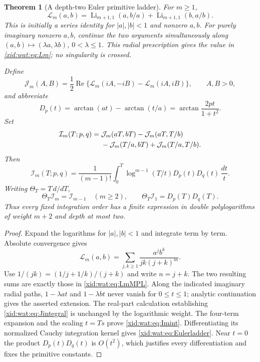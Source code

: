 \documentclass[11pt,a4paper]{article}
\numberwithin{equation}{section}
\newtheorem{theorem}{Theorem}[section]
\theoremstyle{definition}
\theoremstyle{remark}
\begin{document}
\begin{theorem}[A depth-two Euler primitive ladder]
\label{xid:wat:thm:ladder}
For $m\geq1$,
\begin{equation}\label{xid:wat:eq:LmMPL}
 \mathcal L_m(a,b)
 =\operatorname{Li}_{m+1,1}(a,b/a)
  +\operatorname{Li}_{m+1,1}(b,a/b).
\end{equation}
This is initially a series identity for $|a|,|b|<1$ and nonzero $a,b$.
For purely imaginary nonzero $a,b$, continue the two arguments
simultaneously along $(a,b)\mapsto(\lambda a,\lambda b)$,
$0<\lambda\leq1$. This radial prescription gives the value in
\eqref{xid:wat:eq:Lm}; no singularity is crossed.

Define
\[
 \mathcal J_m(A,B)=\frac12\operatorname{Re}
     \{\mathcal L_m(iA,-iB)-\mathcal L_m(iA,iB)\},
 \qquad A,B>0,
\]
and abbreviate
\[
 D_p(t)=\arctan(at)-\arctan(t/a)
       =\arctan\frac{2pt}{1+t^2}.
\]
Set
\begin{align}\label{xid:wat:eq:Imclosed}
 \mathcal I_m(T;p,q)
 ={}&\mathcal J_m(aT,bT)-\mathcal J_m(aT,T/b)\notag\\
   &-\mathcal J_m(T/a,bT)+\mathcal J_m(T/a,T/b).
\end{align}
Then
\begin{equation}\label{xid:wat:eq:Imint}
 \mathcal I_m(T;p,q)
 =\frac1{(m-1)!}\int_0^T
    \log^{m-1}(T/t)D_p(t)D_q(t)\,\frac{dt}{t}.
\end{equation}
Writing $\Theta_T=T\,d/dT$,
\begin{equation}\label{xid:wat:eq:Eulerladder}
 \Theta_T\mathcal I_m=\mathcal I_{m-1}\quad(m\geq2),
 \qquad
 \Theta_T\mathcal I_1=D_p(T)D_q(T).
\end{equation}
Thus every fixed integration order has a finite expression in double
polylogarithms of weight $m+2$ and depth at most two.
\end{theorem}

\begin{proof}
Expand the logarithms for $|a|,|b|<1$ and integrate term by term.
Absolute convergence gives
\[
 \mathcal L_m(a,b)
 =\sum_{j,k\geq1}\frac{a^jb^k}{jk(j+k)^m}.
\]
Use $1/(jk)=(1/j+1/k)/(j+k)$ and write $n=j+k$.
The two resulting sums are exactly those in
\eqref{xid:wat:eq:LmMPL}. Along the indicated imaginary radial paths,
$1-\lambda at$ and $1-\lambda bt$ never vanish for $0\leq t\leq1$;
analytic continuation gives the asserted extension. The real-part
calculation establishing \eqref{xid:wat:eq:Jintegral} is unchanged by
the logarithmic weight. The four-term expansion and the scaling
$t=Ts$ prove \eqref{xid:wat:eq:Imint}. Differentiating its normalized
Cauchy integration kernel gives \eqref{xid:wat:eq:Eulerladder}.
Near $t=0$ the product $D_p(t)D_q(t)$ is $O(t^2)$, which
justifies every differentiation and fixes the primitive constants.
\end{proof}
\end{document}
